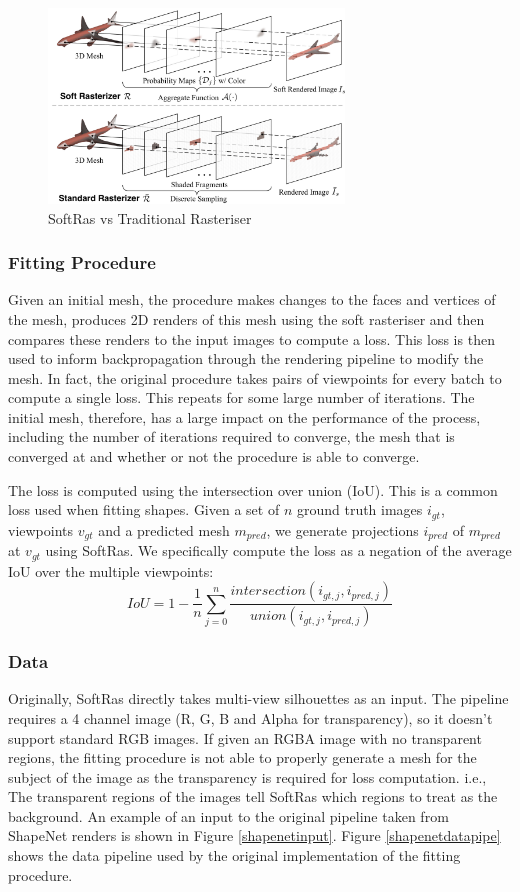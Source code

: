 \documentclass{article}
\begin{document}
\begin{figure}[h!]
  \centering
  \includegraphics[width=0.7\textwidth]{images/softras.png}
  \caption{SoftRas vs Traditional Rasteriser}
  \label{softrasraster}
\end{figure}

\subsubsection{Fitting Procedure}
\label{section:softrasalgo}
Given an initial mesh, the procedure makes changes to the faces and vertices of the mesh, produces 2D renders of this mesh using the soft rasteriser and then compares these renders to the input images to compute a loss. This loss is then used to inform backpropagation through the rendering pipeline to modify the mesh. In fact, the original procedure takes pairs of viewpoints for every batch to compute a single loss. This repeats for some large number of iterations. The initial mesh, therefore, has a large impact on the performance of the process, including the number of iterations required to converge, the mesh that is converged at and whether or not the procedure is able to converge.

The loss is computed using the intersection over union (IoU). This is a common loss used when fitting shapes. Given a set of $n$ ground truth images $i_{gt}$, viewpoints $v_{gt}$ and a predicted mesh $m_{pred}$, we generate projections $i_{pred}$ of $m_{pred}$ at $v_{gt}$ using SoftRas. We specifically compute the loss as a negation of the average IoU over the multiple viewpoints: \[IoU = 1 - \frac{1}{n}\sum_{j=0}^n\frac{intersection(i_{gt, j}, i_{pred, j})}{union(i_{gt, j}, i_{pred, j})}\]

\subsubsection{Data}
Originally, SoftRas directly takes multi-view silhouettes as an input. The pipeline requires a 4 channel image (R, G, B and Alpha for transparency), so it doesn't support standard RGB images. If given an RGBA image with no transparent regions, the fitting procedure is not able to properly generate a mesh for the subject of the image as the transparency is required for loss computation. i.e., The transparent regions of the images tell SoftRas which regions to treat as the background. An example of an input to the original pipeline taken from ShapeNet renders is shown in Figure \ref{shapenetinput}. Figure \ref{shapenetdatapipe} shows the data pipeline used by the original implementation of the fitting procedure.
\end{document}
